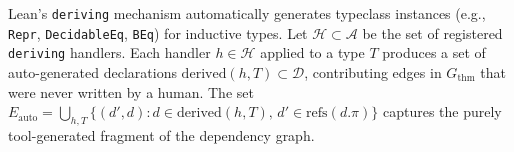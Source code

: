 \begin{definition}\label{def:deriving-edges}
Lean's \texttt{deriving} mechanism automatically generates typeclass instances (e.g., \texttt{Repr}, \texttt{DecidableEq}, \texttt{BEq}) for inductive types. Let $\mathcal{H} \subset \mathcal{A}$ be the set of registered \texttt{deriving} handlers. Each handler $h \in \mathcal{H}$ applied to a type $T$ produces a set of auto-generated declarations $\mathrm{derived}(h, T) \subset \mathcal{D}$, contributing edges in $G_{\mathrm{thm}}$ that were never written by a human. The set $E_{\mathrm{auto}} = \bigcup_{h, T} \{(d', d) : d \in \mathrm{derived}(h, T),\, d' \in \mathrm{refs}(d.\pi)\}$ captures the purely tool-generated fragment of the dependency graph.
\end{definition}

